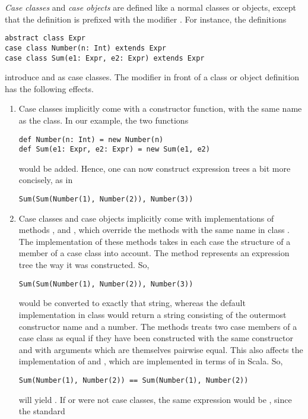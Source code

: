 {\em Case classes} and {\em case objects} are defined like a normal
classes or objects, except that the definition is prefixed with the modifier
.  For instance, the definitions
\begin{lstlisting}
abstract class Expr
case class Number(n: Int) extends Expr
case class Sum(e1: Expr, e2: Expr) extends Expr
\end{lstlisting}
introduce  and  as case classes.
The  modifier in front of a class or object 
definition has the following effects.
\begin{enumerate}
\item Case classes implicitly come with a constructor function, with the same name as the class. In our example, the two functions
\begin{lstlisting}
def Number(n: Int) = new Number(n)
def Sum(e1: Expr, e2: Expr) = new Sum(e1, e2)
\end{lstlisting}
would be added. Hence, one can now construct expression trees a bit more concisely, as in
\begin{lstlisting}
Sum(Sum(Number(1), Number(2)), Number(3))
\end{lstlisting} 
\item Case classes and case objects 
implicitly come with implementations of methods
,  and , which override the
methods with the same name in class . The implementation
of these methods takes in each case the structure of a member of a
case class into account. The  method represents an
expression tree the way it was constructed. So,
\begin{lstlisting}
Sum(Sum(Number(1), Number(2)), Number(3))
\end{lstlisting} 
would be converted to exactly that string, whereas the default
implementation in class  would return a string consisting
of the outermost constructor name  and a number.  The
 methods treats two case members of a case class as equal
if they have been constructed with the same constructor and with
arguments which are themselves pairwise equal. This also affects the
implementation of \code{==} and \code{!=}, which are implemented in
terms of  in Scala. So,
\begin{lstlisting}
Sum(Number(1), Number(2)) == Sum(Number(1), Number(2))
\end{lstlisting}
will yield . If  or  were not case
classes, the same expression would be , since the standard

\end{enumerate}
